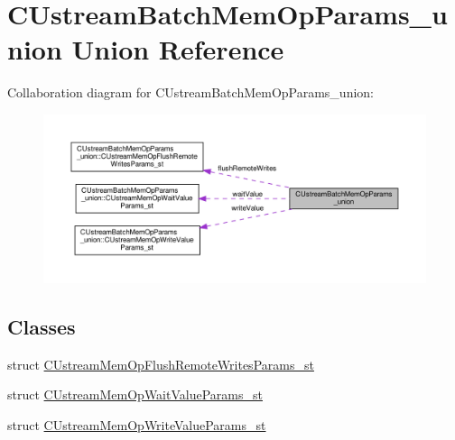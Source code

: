 \hypertarget{unionCUstreamBatchMemOpParams__union}{}\section{C\+Ustream\+Batch\+Mem\+Op\+Params\+\_\+union Union Reference}
\label{unionCUstreamBatchMemOpParams__union}


Collaboration diagram for C\+Ustream\+Batch\+Mem\+Op\+Params\+\_\+union\+:\nopagebreak
\begin{figure}[H]
\begin{center}
\leavevmode
\includegraphics[width=350pt]{unionCUstreamBatchMemOpParams__union__coll__graph}
\end{center}
\end{figure}
\subsection*{Classes}
\begin{DoxyCompactItemize}
\item 
struct \hyperlink{structCUstreamBatchMemOpParams__union_1_1CUstreamMemOpFlushRemoteWritesParams__st}{C\+Ustream\+Mem\+Op\+Flush\+Remote\+Writes\+Params\+\_\+st}
\item 
struct \hyperlink{structCUstreamBatchMemOpParams__union_1_1CUstreamMemOpWaitValueParams__st}{C\+Ustream\+Mem\+Op\+Wait\+Value\+Params\+\_\+st}
\item 
struct \hyperlink{structCUstreamBatchMemOpParams__union_1_1CUstreamMemOpWriteValueParams__st}{C\+Ustream\+Mem\+Op\+Write\+Value\+Params\+\_\+st}
\end{DoxyCompactItemize}
